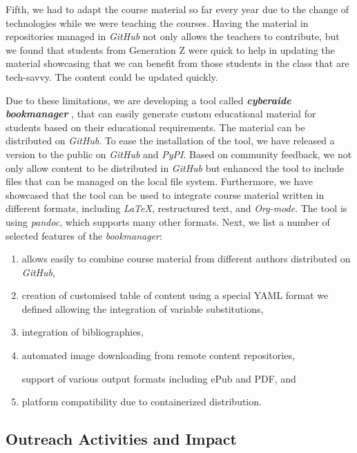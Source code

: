 \documentclass[conference]{IEEEtran}
\begin{document}
Fifth, we had to adapt the course material so far every year due to the
change of technologies while we were teaching the courses. Having the
material in repositories managed in \emph{GitHub} not only allows the
teachers to contribute, but we found that students from Generation Z
were quick to help in updating the material showcasing that we can
benefit from those students in the class that are tech-savvy. The
content could be updated quickly.

Due to these limitations, we are developing a tool called
\emph{\textbf{cyberaide bookmanager}} \cite{pypi-bookmanager}, that
can easily generate custom educational material for students based on
their educational requirements. The material can be distributed on
\emph{GitHub}. To ease the installation of the tool, we have released a
version to the public on \emph{GitHub} and \emph{PyPI}. Based on
community feedback, we not only allow content to be distributed in
\emph{GitHub} but enhanced the tool to include files that can be
managed on the local file system.  Furthermore, we have showcased that
the tool can be used to integrate course material written in different
formats, including \emph{LaTeX}, restructured text, and
\emph{Org-mode}. The tool is using \emph{pandoc}, which supports many
other formats. Next, we list a number of selected features of the \emph{bookmanager}:

\begin{enumerate}
\item  allows easily to combine course material from
  different authors distributed on \emph{GitHub},
  
\item creation of customised table of content using a special YAML
  format we defined allowing the integration of variable substitutions,
  
\item integration of bibliographies,
    
\item automated image downloading from remote content
  repositories,
  
\itme support of various output formats including ePub and PDF, and 

\item platform compatibility due to containerized distribution.
  
\end{enumerate}

\subsection{Outreach Activities and Impact}
\end{document}
